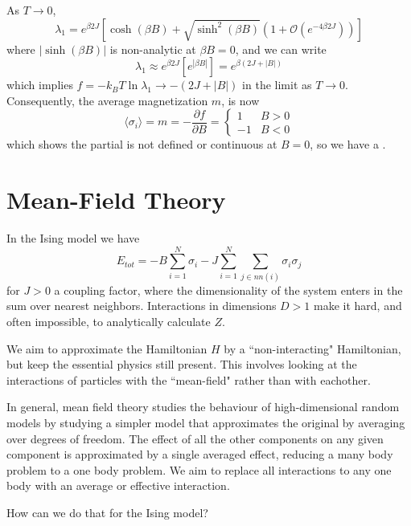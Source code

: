 \documentclass[12pt, a4paper, oneside, openright, titlepage]{book}
\begin{document}
As $T\rightarrow 0$, $$\lambda_1 = e^{\beta 2J}\left[\cosh(\beta B)+\sqrt{\sinh^2(\beta B)}(1 + \mathcal{O}(e^{-4\beta 2J}))\right]$$ where $|\sinh(\beta B)|$ is non-analytic at $\beta B = 0$, and we can write $$\lambda_1 \approx e^{\beta 2J}[e^{|\beta B|}] = e^{\beta (2J+|B|)}$$
which implies $f = -k_BT\ln\lambda_1 \rightarrow -(2J+|B|)$ in the limit as $T\rightarrow 0$. Consequently, the average magnetization $m$, is now $$\langle \sigma_i \rangle = m = -\frac{\partial f}{\partial B} = \left\{\begin{array}{cc} 1 & B > 0 \\ -1 & B < 0 \end{array}\right.$$ which shows the partial is not defined or continuous at $B = 0$, so we have a .





\section{Mean-Field Theory}


In the Ising model we have $$E_{tot} = -B\sum_{i=1}^N\sigma_i - J\sum_{i=1}^N\sum_{j \in nn(i)}\sigma_i\sigma_j$$ for $J > 0$ a coupling factor, where the dimensionality of the system enters in the sum over nearest neighbors. Interactions in dimensions $D > 1$ make it hard, and often impossible, to analytically calculate $Z$.

\begin{axi}
    We aim to approximate the Hamiltonian $H$ by a ``non-interacting" Hamiltonian, but keep the essential physics still present. This involves looking at the interactions of particles with the ``mean-field" rather than with eachother.
\end{axi}

In general, mean field theory studies the behaviour of high-dimensional random models by studying a simpler model that approximates the original by averaging over degrees of freedom. The effect of all the other components on any given component is approximated by a single averaged effect, reducing a many body problem to a one body problem. We aim to replace all interactions to any one body with an average or effective interaction. 

\begin{qst}
    How can we do that for the Ising model?
\end{qst}
\end{document}
